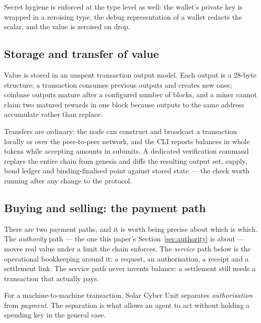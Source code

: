 \documentclass{article}
\begin{document}
Secret hygiene is enforced at the type level as well: the wallet's private key
is wrapped in a zeroising type, the debug representation of a wallet redacts
the scalar, and the value is zeroised on drop.

\subsection{Storage and transfer of value}

Value is stored in an unspent transaction output model. Each output is a
28-byte structure; a transaction consumes previous outputs and creates new
ones; coinbase outputs mature after a configured number of blocks, and a
miner cannot claim two matured rewards in one block because outputs to the
same address accumulate rather than replace.

Transfers are ordinary: the node can construct and broadcast a transaction
locally or over the peer-to-peer network, and the CLI reports balances in whole
tokens while accepting amounts in subunits. A dedicated verification command
replays the entire chain from genesis and diffs the resulting output set,
supply, bond ledger and binding-finalised point against stored state --- the
check worth running after any change to the protocol.

\subsection{Buying and selling: the payment path}
\label{sec:payments}

There are two payment paths, and it is worth being precise about which is which.
The \emph{authority} path --- the one this paper's Section~\ref{sec:authority}
is about --- moves real value under a limit the chain enforces. The
\emph{service} path below is the operational bookkeeping around it: a request, an
authorisation, a receipt and a settlement link. The service path never invents
balance: a settlement still needs a transaction that actually pays.

For a machine-to-machine transaction, Solar Cyber Unit separates \emph{authorisation}
from \emph{payment}. The separation is what allows an agent to act without
holding a spending key in the general case.
\end{document}
